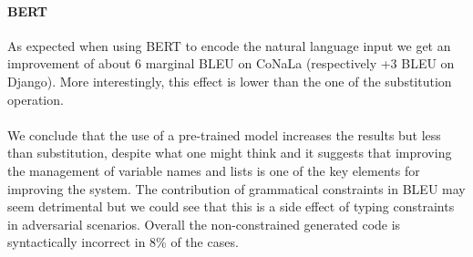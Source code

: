 \documentclass[11pt]{article}
\begin{document}
\paragraph{BERT} As expected when using BERT to encode the natural language input we get an improvement of about 6 marginal BLEU on {\selectfont CoNaLa} (respectively +3 BLEU on {\selectfont Django}). More interestingly, this effect is lower than the one of the substitution operation.
\paragraph{}We conclude that the use of a pre-trained model increases the results but less than substitution, despite what one might think and it suggests that improving the management of variable names and lists is one of the key elements for improving the system. The contribution of grammatical constraints in BLEU may seem detrimental but we could see that this is a side effect of typing constraints in adversarial scenarios. Overall the non-constrained generated code is syntactically incorrect in 8\% of the cases.
\end{document}
